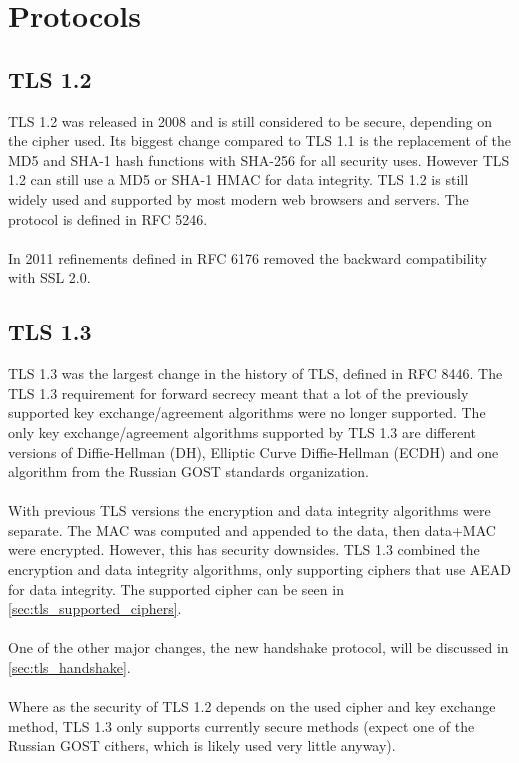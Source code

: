 \documentclass[11pt]{scrartcl} %
\begin{document}
\section{Protocols}

\subsection{TLS 1.2}

TLS 1.2 was released in 2008 and is still considered to be secure, depending on the cipher used. Its biggest change compared to TLS 1.1 is the replacement of the MD5 and SHA-1 hash functions with SHA-256 for all security uses. However TLS 1.2 can still use a MD5 or SHA-1 HMAC for data integrity. TLS 1.2 is still widely used and supported by most modern web browsers and servers. The protocol is defined in RFC 5246.
\\\\
In 2011 refinements defined in RFC 6176 removed the backward compatibility with SSL 2.0.

\subsection{TLS 1.3}

TLS 1.3 was the largest change in the history of TLS, defined in RFC 8446. The TLS 1.3 requirement for forward secrecy meant that a lot of the previously supported key exchange/agreement algorithms were no longer supported. The only key exchange/agreement algorithms supported by TLS 1.3 are different versions of Diffie-Hellman (DH), Elliptic Curve Diffie-Hellman (ECDH) and one algorithm from the Russian GOST standards organization. 
\\\\
With previous TLS versions the encryption and data integrity algorithms were separate. The MAC was computed and appended to the data, then data+MAC were encrypted. However, this has security downsides. TLS 1.3 combined the encryption and data integrity algorithms, only supporting ciphers that use AEAD for data integrity. The supported cipher can be seen in \ref{sec:tls_supported_ciphers}.
\\\\
One of the other major changes, the new handshake protocol, will be discussed in \ref{sec:tls_handshake}.
\\\\
Where as the security of TLS 1.2 depends on the used cipher and key exchange method, TLS 1.3 only supports currently secure methods (expect one of the Russian GOST cithers, which is likely used very little anyway).
\end{document}
